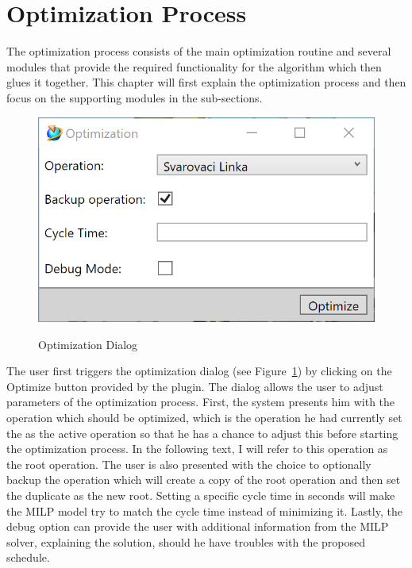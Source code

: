 \section{Optimization Process}

The optimization process consists of the main optimization routine and several modules that provide the required functionality for the algorithm which then glues it together. This chapter will first explain the optimization process and then focus on the supporting modules in the sub-sections. \\

\begin{figure}[H]
	\caption{Optimization Dialog}
	\centering
	\includegraphics{dialog_beginoptimization}
	\label{fig:DialogBeginOptimization}
\end{figure}

The user first triggers the optimization dialog (see Figure~\ref{fig:DialogBeginOptimization}) by clicking on the Optimize button provided by the plugin. 
The dialog allows the user to adjust parameters of the optimization process. 
First, the system presents him with the operation which should be optimized, which is the operation he had currently set the as the active operation so that he has a chance to adjust this before starting the optimization process. 
In the following text, I will refer to this operation as the root operation.
The user is also presented with the choice to optionally backup the operation which will create a copy of the root operation and then set the duplicate as the new root.
Setting a specific cycle time in seconds will make the MILP model try to match the cycle time instead of minimizing it.
Lastly, the debug option can provide the user with additional information from the MILP solver, explaining the solution, should he have troubles with the proposed schedule. \\

